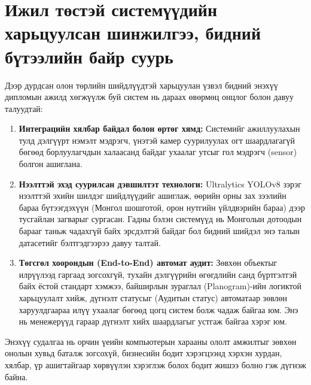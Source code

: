 \section{Ижил төстэй системүүдийн харьцуулсан шинжилгээ, бидний бүтээлийн байр суурь}
Дээр дурдсан олон төрлийн шийдлүүдтэй харьцуулан үзвэл бидний энэхүү дипломын ажилд хөгжүүлж буй систем нь дараах өвөрмөц онцлог болон давуу талуудтай:

\begin{enumerate}
    \item \textbf{Интеграцийн хялбар байдал болон өртөг хямд:} Системийг ажиллуулахын тулд дэлгүүрт нэмэлт мэдрэгч, үнэтэй камер суурилуулах огт шаардлагагүй бөгөөд борлуулагчдын халаасанд байдаг ухаалаг утсыг гол мэдрэгч (sensor) болгон ашиглана.
    \item \textbf{Нээлттэй эхэд суурилсан дэвшилтэт технологи:} Ultralytics YOLOv8 зэрэг нээлттэй эхийн шилдэг шийдлүүдийг ашиглаж, өөрийн орны зах зээлийн бараа бүтээгдэхүүн (Монгол шошготой, орон нутгийн үйлдвэрийн бараа) дээр тусгайлан загварыг сургасан. Гадны бэлэн системүүд нь Монголын дотоодын барааг таньж чадахгүй байх эрсдэлтэй байдаг бол бидний шийдэл энэ талын датасетийг бэлтгэдгээрээ давуу талтай.
    \item \textbf{Төгсгөл хоорондын (End-to-End) автомат аудит:} Зөвхөн объектыг илрүүлээд гаргаад зогсохгүй, тухайн дэлгүүрийн өгөгдлийн санд бүртгэлтэй байх ёстой стандарт хэмжээ, байширлын зураглал (Planogram)-ийн логиктой харьцуулалт хийж, дүгнэлт статусыг (Аудитын статус) автоматаар зөвлөн харуулдгаараа илүү ухаалаг бөгөөд цогц систем болж чадаж байгаа юм. Энэ нь менежерүүд гараар дүгнэлт хийх шаардлагыг устгаж байгаа хэрэг юм.
\end{enumerate}

Энэхүү судалгаа нь орчин үеийн компьютерын харааны ололт амжилтыг зөвхөн онолын хувьд баталж зогсохүй, бизнесийн бодит хэрэгцээнд хэрхэн хурдан, хялбар, үр ашигтайгаар хөрвүүлэн хэрэглэж болох бодит жишээ болно гэж дүгнэж байна.
